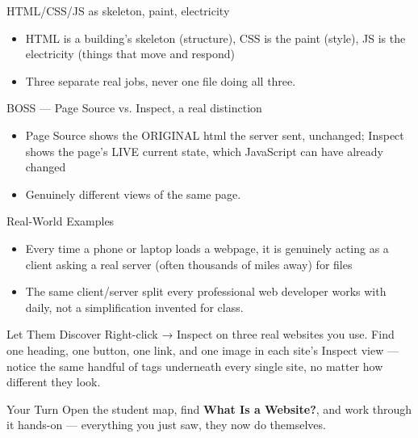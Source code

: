 \documentclass[aspectratio=169]{beamer}
\begin{document}
\begin{frame}{HTML/CSS/JS as skeleton, paint, electricity}
    \large
    \begin{itemize}
        \item HTML is a building's skeleton (structure), CSS is the paint (style), JS is the electricity (things that move and respond)
        \item Three separate real jobs, never one file doing all three.
    \end{itemize}
\end{frame}


\begin{frame}{BOSS — Page Source vs. Inspect, a real distinction}
    \large
    \begin{itemize}
        \item Page Source shows the ORIGINAL html the server sent, unchanged; Inspect shows the page's LIVE current state, which JavaScript can have already changed
        \item Genuinely different views of the same page.
    \end{itemize}
\end{frame}

\begin{frame}{Real-World Examples}
    \large
    \begin{itemize}
        \item Every time a phone or laptop loads a webpage, it is genuinely acting as a client asking a real server (often thousands of miles away) for files
        \item The same client/server split every professional web developer works with daily, not a simplification invented for class.
    \end{itemize}
\end{frame}


\begin{frame}{Let Them Discover}
    \Large
    Right-click → Inspect on three real websites you use. Find one heading, one button, one link, and one image in each site's Inspect view — notice the same handful of tags underneath every single site, no matter how different they look.
\end{frame}

\begin{frame}{Your Turn}
    \Large
    Open the student map, find \textbf{What Is a Website?}, and work through it
    hands-on --- everything you just saw, they now do themselves.
\end{frame}
\end{document}
